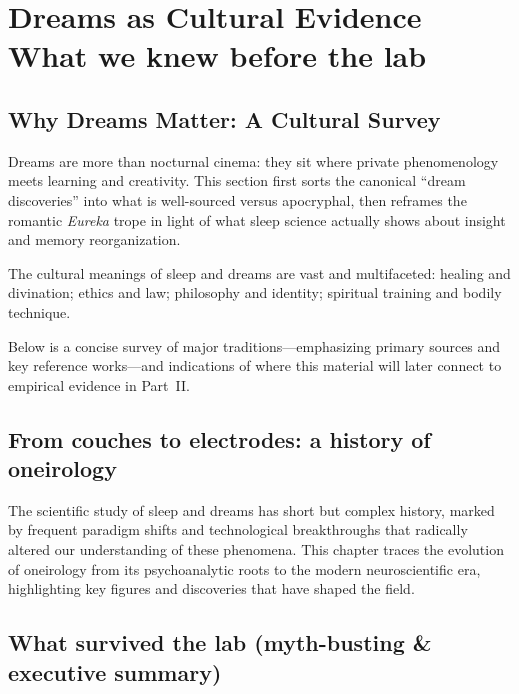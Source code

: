 \part{Dreams as Cultural Evidence\\ \large What we knew before the lab}\label{part:culture}
\newpage


\chapter{Why Dreams Matter: A Cultural Survey}\label{ch:why_dreams_matter}

Dreams are more than nocturnal cinema: they sit where private phenomenology meets learning and creativity. This section first sorts the canonical ``dream discoveries'' into what is well-sourced versus apocryphal, then reframes the romantic \emph{Eureka} trope in light of what sleep science actually shows about insight and memory reorganization.

The cultural meanings of sleep and dreams are vast and multifaceted: healing and divination; ethics and law; philosophy and identity; spiritual training and bodily technique.

Below is a concise survey of major traditions—emphasizing primary sources and key reference works—and indications of where this material will later connect to empirical evidence in Part~II.\@









\chapter{From couches to electrodes: a history of oneirology}\label{ch:history_oneirology}

The scientific study of sleep and dreams has short but complex history, marked by frequent paradigm shifts and technological breakthroughs that radically altered our understanding of these phenomena. This chapter traces the evolution of oneirology from its psychoanalytic roots to the modern neuroscientific era, highlighting key figures and discoveries that have shaped the field.







\chapter{What survived the lab (myth-busting \& executive summary)}\label{ch:what_survived}





